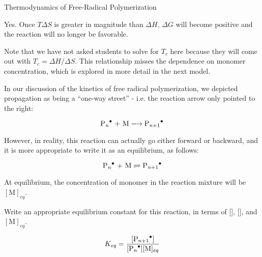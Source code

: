 \begin{activity}{Thermodynamics of Free-Radical Polymerization}
\begin{ctqs}
		\begin{solution}[1.25in]
			Yes.  Once $T\Delta S$ is greater in magnitude than $\Delta H$, $\Delta G$ will become positive and the reaction will no longer be favorable.
			
			Note that we have not asked students to solve for $T_c$ here because they will come out with $T_c = \Delta H/\Delta S$.  This relationship misses the dependence on monomer concentration, which is explored in more detail in the next model.
		\end{solution}

\end{ctqs}




\begin{model}
	\label{\labelbase:mdl:propequilib}

	In our discussion of the kinetics of free radical polymerization, we depicted propagation as being a ``one-way street'' - i.e. the reaction arrow only pointed to the right:
	
	\begin{equation*}
		\text{\ce{P_n^.} + M} \xlongrightarrow{} \text{\ce{P_{n+1}^.}}
	\end{equation*}
	
	However, in reality, this reaction can actually go either forward or backward, and it is more appropriate to write it as an equilibrium, as follows:
	
	\begin{equation*}
		\text{\ce{P_n^.} + M} \rightleftharpoons{} \text{\ce{P_{n+1}^.}}
	\end{equation*}
	
	At equilibrium, the concentration of monomer in the reaction mixture will be $[\text{M}]_{eq}$.
	
\end{model}


\begin{ctqs}

	\question Write an appropriate equilibrium constant for this reaction, in terms of [], [], and $[\text{M}]_{eq}$.
				
				\begin{solution}[1in]
					\begin{equation*}
						K_{eq} = \frac{[\ce{P_{n+1}^.}]}{[\ce{P_n^.}][\text{M}]_{eq}}
					\end{equation*}
				\end{solution}
	

\end{ctqs}
\end{activity}
